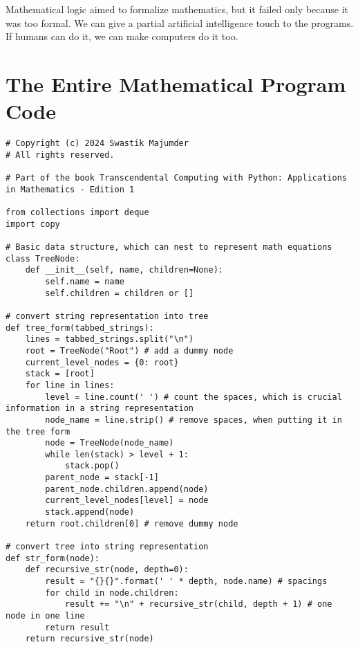 \documentclass{book}
\begin{document}
Mathematical logic aimed to formalize mathematics, but it failed only because it was too formal. We can give a partial artificial intelligence touch to the programs. If humans can do it, we can make computers do it too.

\chapter{The Entire Mathematical Program Code}

\begin{lstlisting}[style=mystyle, caption={main.py}, label={lst:python_code}]
# Copyright (c) 2024 Swastik Majumder
# All rights reserved.

# Part of the book Transcendental Computing with Python: Applications in Mathematics - Edition 1

from collections import deque
import copy

# Basic data structure, which can nest to represent math equations
class TreeNode:
    def __init__(self, name, children=None):
        self.name = name
        self.children = children or []

# convert string representation into tree
def tree_form(tabbed_strings):
    lines = tabbed_strings.split("\n")
    root = TreeNode("Root") # add a dummy node
    current_level_nodes = {0: root}
    stack = [root]
    for line in lines:
        level = line.count(' ') # count the spaces, which is crucial information in a string representation
        node_name = line.strip() # remove spaces, when putting it in the tree form
        node = TreeNode(node_name)
        while len(stack) > level + 1:
            stack.pop()
        parent_node = stack[-1]
        parent_node.children.append(node)
        current_level_nodes[level] = node
        stack.append(node)
    return root.children[0] # remove dummy node

# convert tree into string representation
def str_form(node):
    def recursive_str(node, depth=0):
        result = "{}{}".format(' ' * depth, node.name) # spacings
        for child in node.children:
            result += "\n" + recursive_str(child, depth + 1) # one node in one line
        return result
    return recursive_str(node)


\end{lstlisting}
\end{document}
